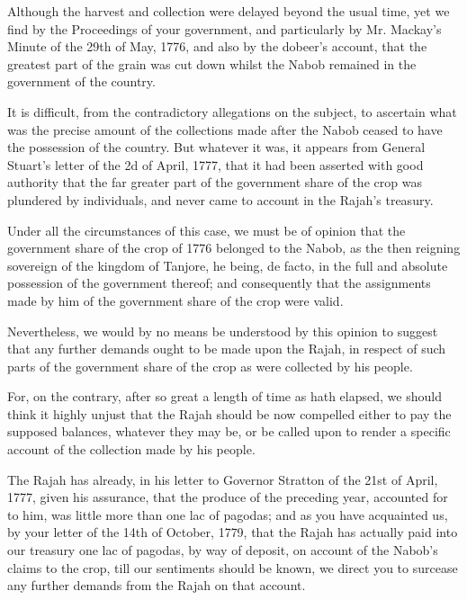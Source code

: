Although the harvest and collection were delayed beyond the usual time, yet we find by the Proceedings of your government, and particularly by Mr. Mackay's Minute of the 29th of May, 1776, and also by the dobeer's account, that the greatest part of the grain was cut down whilst the Nabob remained in the government of the country.

It is difficult, from the contradictory allegations on the subject, to ascertain what was the precise amount of the collections made after the Nabob ceased to have the possession of the country. But whatever it was, it appears from General Stuart's letter of the 2d of April, 1777, that it had been asserted with good authority that the far greater part of the government share of the crop was plundered by individuals, and never came to account in the Rajah's treasury.

Under all the circumstances of this case, we must be of opinion that the government share of the crop of 1776 belonged to the Nabob, as the then reigning sovereign of the kingdom of Tanjore, he being, de facto, in the full and absolute possession of the government thereof; and consequently that the assignments made by him of the government share of the crop were valid.

Nevertheless, we would by no means be understood by this opinion to suggest that any further demands ought to be made upon the Rajah, in respect of such parts of the government share of the crop as were collected by his people.

For, on the contrary, after so great a length of time as hath elapsed, we should think it highly unjust that the Rajah should be now compelled either to pay the supposed balances, whatever they may be, or be called upon to render a specific account of the collection made by his people.

The Rajah has already, in his letter to Governor Stratton of the 21st of April, 1777, given his assurance, that the produce of the preceding year, accounted for to him, was little more than one lac of pagodas; and as you have acquainted us, by your letter of the 14th of October, 1779, that the Rajah has actually paid into our treasury one lac of pagodas, by way of deposit, on account of the Nabob's claims to the crop, till our sentiments should be known, we direct you to surcease any further demands from the Rajah on that account.

